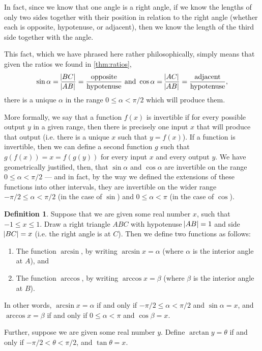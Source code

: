 \documentclass[a4paper,leqno]{article}
\numberwithin{equation}{section}
\theoremstyle{definition}
\newtheorem{defn}[equation]{Definition}
\theoremstyle{remark}
\begin{document}
In fact, since we know that one angle is a right angle, if we know the lengths of only two sides together with their position in relation
to the right angle (whether each is opposite, hypotenuse, or adjacent), then we know the length of the third side together with the angle.

This fact, which we have phrased here rather philosophically, simply means that given the ratios we found in \ref{thm:ratios},
\begin{equation}
      \sin \alpha = \frac{\abs{BC}}{\abs{AB}} = \frac{\text{opposite}}{\text{hypotenuse}} \text{ and }
      \cos \alpha = \frac{\abs{AC}}{\abs{AB}} = \frac{\text{adjacent}}{\text{hypotenuse}},
\end{equation}
there is a unique $ \alpha $ in the range $ 0 \leq \alpha < \pi/2 $ which will produce them.

More formally, we say that a function $ f(x) $ is invertible if for every possible output $ y $ in a given range, then there is precisely
one input $ x $ that will produce that output (i.e. there is a unique $ x $ such that $ y = f(x) $). If a function is invertible, then we
can define a second function $ g $ such that $ g(f(x)) = x = f(g(y)) $ for every input $ x $ and every output $ y $. We have geometrically justified, then,
that $ \sin \alpha $ and $ \cos \alpha $ are invertible on the range $ 0 \leq \alpha < \pi/2 $ --- and in fact, by the way we defined the
extensions of these functions into other intervals, they are invertible on the wider range $ -\pi/2 \leq \alpha < \pi/2 $ (in the case of $\sin$)
and $ 0 \leq \alpha < \pi $ (in the case of $\cos $).

\begin{defn}
  Suppose that we are given some real number $ x $, such that $ -1 \leq x \leq 1 $. Draw a right triangle $ ABC $ with hypotenuse $\abs{AB} = 1 $
  and side $ \abs{BC} = x $ (i.e. the right angle is at $ C $). Then we define two functions as follows:
  \begin{enumerate}
    \item The function $ \arcsin $, by writing $ \arcsin x = \alpha $ (where $ \alpha $ is the interior angle at $ A $), and
    \item The function $ \arccos $, by writing $ \arccos x = \beta $ (where $ \beta $ is the interior angle at $ B $).
  \end{enumerate}
  In other words, $ \arcsin x = \alpha $ if and only if $ -\pi/2 \leq \alpha < \pi/2 $ and $ \sin \alpha = x $, and $ \arccos x = \beta $ if
  and only if $ 0 \leq \alpha < \pi $ and $ \cos \beta = x $.

  Further, suppose we are given some real number $ y $. Define $ \arctan y = \theta $ if and only if $ -\pi/2 < \theta < \pi/2 $, and $ \tan \theta = x $.
\end{defn}
\end{document}

